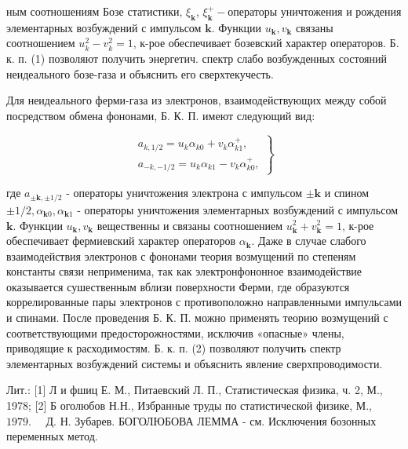 \documentclass[10pt]{article}
\begin{document}
ным соотношениям Бозе статистики, $\xi_{\boldsymbol{k}}$, $\xi_{\boldsymbol{k}}^{+}-$операторы уничтожения и рождения элементарных возбуждений с импульсом $\boldsymbol{k}$. Функции $u_{\boldsymbol{k}}, v_{\boldsymbol{k}}$ связаны соотношением $u_{k}^{2}-v_{k}^{2}=1$, к-рое обеспечивает бозевский характер операторов. Б. к. п. (1) позволяют получить энергетич. спектр слабо возбужденных состояний неидеального бозе-газа и объяснить его сверхтекучесть.



Для неидеального ферми-газа из электронов, взаимодействующих между собой посредством обмена фононами, Б. К. П. имеют следующий вид:



\[

\left.\begin{array}{l}

a_{k, 1 / 2}=u_{k} \alpha_{k 0}+v_{k} \alpha_{k 1}^{+}, \\

a_{-k,-1 / 2}=u_{k} \alpha_{k 1}-v_{k} \alpha_{k 0}^{+},

\end{array}\right\}

\]



где $a_{ \pm \boldsymbol{k}, \pm 1 / 2}$ - операторы уничтожения электрона с импульсом $\pm \boldsymbol{k}$ и спином $\pm 1 / 2, \alpha_{\boldsymbol{k} 0}, \alpha_{\boldsymbol{k} 1}$ - операторы уничтожения элементарных возбуждений с импульсом $\boldsymbol{k}$. Функции $u_{\boldsymbol{k}}, v_{\boldsymbol{k}}$ вещественны и связаны соотношением $u_{\boldsymbol{k}}^{2}+v_{\boldsymbol{k}}^{2}=1$, к-рое обеспечивает фермиевский характер операторов $\alpha_{\boldsymbol{k}}$. Даже в случае слабого взаимодействия электронов с фононами теория возмущений по степеням константы связи неприменима, так как электронфононное взаимодействие оказывается сушественным вблизи поверхности Ферми, где образуются коррелированные пары электронов с противоположно направленными импульсами и спинами. После проведения Б. К. П. можно применять теорию возмущений с соответствующими предосторожностями, исключив «опасные» члены, приводящие к расходимостям. Б. к. п. (2) позволяют получить спектр элементарных возбуждений системы и объяснить явление сверхпроводимости.



Лит.: [1] Л и фшиц Е. М., Питаевский Л. П., Статистическая физика, ч. 2, М., 1978; [2] Б оголюбов Н.Н., Избранные труды по статистической физике, М., $1979 . \quad$ Д. Н. Зубарев. БОГОЛЮБОВА ЛЕММА - см. Исключения бозонных переменных метод.
\end{document}
